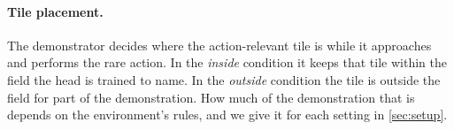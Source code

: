 \paragraph{Tile placement.}
The demonstrator decides where the action-relevant tile is while it approaches and performs the rare action.
In the \emph{inside} condition it keeps that tile within the field the head is trained to name.
In the \emph{outside} condition the tile is outside the field for part of the demonstration.
How much of the demonstration that is depends on the environment's rules, and we give it for each setting in \cref{sec:setup}.
